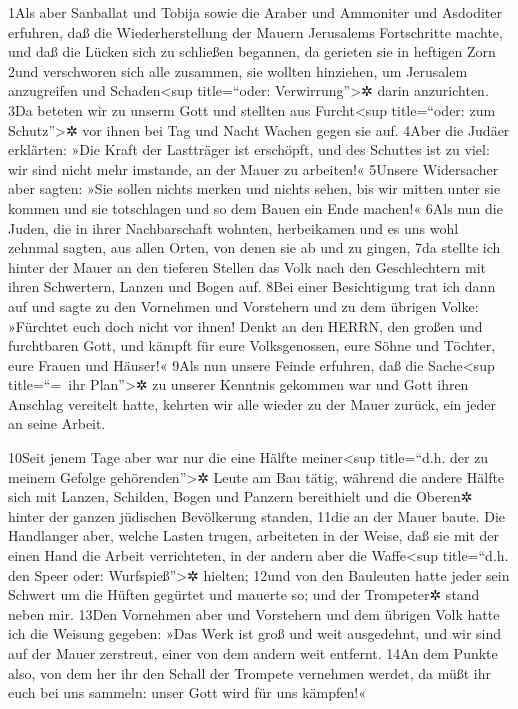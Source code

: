 1Als aber Sanballat und Tobija sowie die Araber und Ammoniter und
Asdoditer erfuhren, daß die Wiederherstellung der Mauern Jerusalems
Fortschritte machte, und daß die Lücken sich zu schließen begannen, da
gerieten sie in heftigen Zorn 2und verschworen sich alle zusammen, sie
wollten hinziehen, um Jerusalem anzugreifen und Schaden\textless sup
title=``oder: Verwirrung''\textgreater✲ darin anzurichten. 3Da beteten
wir zu unserm Gott und stellten aus Furcht\textless sup title=``oder:
zum Schutz''\textgreater✲ vor ihnen bei Tag und Nacht Wachen gegen sie
auf. 4Aber die Judäer erklärten: »Die Kraft der Lastträger ist
erschöpft, und des Schuttes ist zu viel: wir sind nicht mehr imstande,
an der Mauer zu arbeiten!« 5Unsere Widersacher aber sagten: »Sie sollen
nichts merken und nichts sehen, bis wir mitten unter sie kommen und sie
totschlagen und so dem Bauen ein Ende machen!« 6Als nun die Juden, die
in ihrer Nachbarschaft wohnten, herbeikamen und es uns wohl zehnmal
sagten, aus allen Orten, von denen sie ab und zu gingen, 7da stellte ich
hinter der Mauer an den tieferen Stellen das Volk nach den Geschlechtern
mit ihren Schwertern, Lanzen und Bogen auf. 8Bei einer Besichtigung trat
ich dann auf und sagte zu den Vornehmen und Vorstehern und zu dem
übrigen Volke: »Fürchtet euch doch nicht vor ihnen! Denkt an den HERRN,
den großen und furchtbaren Gott, und kämpft für eure Volksgenossen, eure
Söhne und Töchter, eure Frauen und Häuser!« 9Als nun unsere Feinde
erfuhren, daß die Sache\textless sup title=``=~ihr Plan''\textgreater✲
zu unserer Kenntnis gekommen war und Gott ihren Anschlag vereitelt
hatte, kehrten wir alle wieder zu der Mauer zurück, ein jeder an seine
Arbeit.

10Seit jenem Tage aber war nur die eine Hälfte meiner\textless sup
title=``d.h. der zu meinem Gefolge gehörenden''\textgreater✲ Leute am
Bau tätig, während die andere Hälfte sich mit Lanzen, Schilden, Bogen
und Panzern bereithielt und die Oberen✲ hinter der ganzen jüdischen
Bevölkerung standen, 11die an der Mauer baute. Die Handlanger aber,
welche Lasten trugen, arbeiteten in der Weise, daß sie mit der einen
Hand die Arbeit verrichteten, in der andern aber die Waffe\textless sup
title=``d.h. den Speer oder: Wurfspieß''\textgreater✲ hielten; 12und von
den Bauleuten hatte jeder sein Schwert um die Hüften gegürtet und
mauerte so; und der Trompeter✲ stand neben mir. 13Den Vornehmen aber und
Vorstehern und dem übrigen Volk hatte ich die Weisung gegeben: »Das Werk
ist groß und weit ausgedehnt, und wir sind auf der Mauer zerstreut,
einer von dem andern weit entfernt. 14An dem Punkte also, von dem her
ihr den Schall der Trompete vernehmen werdet, da müßt ihr euch bei uns
sammeln: unser Gott wird für uns kämpfen!«


